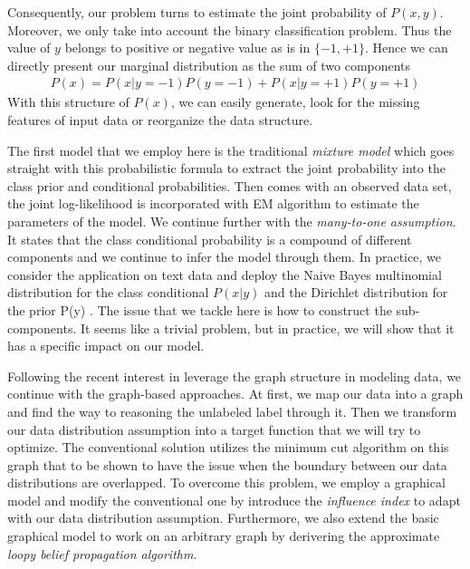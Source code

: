 Consequently, our problem turns to estimate the joint probability of $P(x, y)$. Moreover, we only take into account the binary classification problem. Thus the value of $y$ belongs to positive or negative value as is in $\{-1, +1\}$. Hence we can directly present our marginal distribution as the sum of two components
\begin{align}
	\label{equal1: mixture of labels}
	P(x) = P(x| y=-1)P(y=-1) + P(x| y=+1)P(y=+1)
\end{align} 
With this structure of $P(x)$, we can easily generate, look for the missing features of input data or reorganize the data structure.

The first model that we employ here is the traditional \textit{mixture model} which goes straight with this probabilistic formula to extract the joint probability into the class prior and conditional probabilities. Then comes with an observed data set, the joint log-likelihood is incorporated with EM algorithm \parencite{10.2307/2984875} to estimate the parameters of the model. We continue further with the \textit{many-to-one assumption}. It states that the class conditional probability is a compound of different components and we continue to infer the model through them. In practice, we consider the application on text data and deploy the Naive Bayes multinomial distribution for the class conditional $P(x|y)$ and the Dirichlet distribution for the prior P(y) \parencite{Nigam:2000:TCL:347709.347724}. The issue that we tackle here is how to construct the sub-components. It seems like a trivial problem, but in practice, we will show that it has a specific impact on our model.

Following the recent interest in leverage the graph structure in modeling data, we continue with the graph-based approaches. At first, we map our data into a graph and find the way to reasoning the unlabeled label through it. Then we transform our data distribution assumption into a target function that we will try to optimize. The conventional solution utilizes the minimum cut algorithm on this graph \parencite{Blum:2001:LLU:645530.757779} that to be shown to have the issue when the boundary between our data distributions are overlapped. To overcome this problem, we employ a graphical model and modify the conventional one by introduce the \textit{influence index} to adapt with our data distribution assumption. Furthermore, we also extend the basic graphical model to work on an arbitrary graph by derivering the approximate \textit{loopy belief propagation algorithm}.

